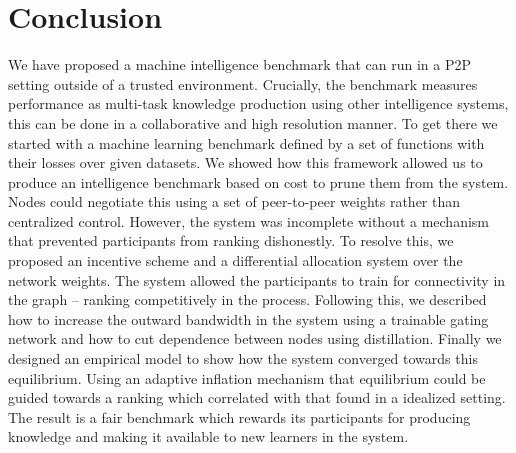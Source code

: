 \documentclass{article}
\begin{document}
\section{Conclusion}
\label{conclusion}
We have proposed a machine intelligence benchmark that can run in a P2P setting outside of a trusted environment. Crucially, the benchmark measures performance as multi-task knowledge production using other intelligence systems, this can be done in a collaborative and high resolution manner. To get there we started with a machine learning benchmark defined by a set of functions with their losses over given datasets. We showed how this framework allowed us to produce an intelligence benchmark based on cost to prune them from the system. Nodes could negotiate this using a set of peer-to-peer weights rather than centralized control. However, the system was incomplete without a mechanism that prevented participants from ranking dishonestly. To resolve this, we proposed an incentive scheme and a differential allocation system over the network weights. The system allowed the participants to train for connectivity in the graph -- ranking competitively in the process. Following this, we described how to increase the outward bandwidth in the system using a trainable gating network and how to cut dependence between nodes using distillation. Finally we designed an empirical model to show how the system converged towards this equilibrium. Using an adaptive inflation mechanism that equilibrium could be guided towards a ranking which correlated with that found in a idealized setting. The result is a fair benchmark which rewards its participants for producing knowledge and making it available to new learners in the system.

\newpage
\end{document}
